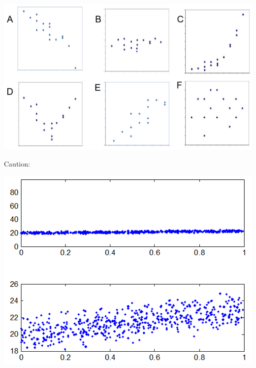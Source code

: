 \documentclass[11pt,letterpaper,twoside]{article}
\begin{document}
\begin{center}
\includegraphics[scale=0.8]{images/scatters2.png}
\end{center}

\newpage

Caution:

\begin{center}
\includegraphics[scale=1]{images/scatters3.png}
\end{center}

\label{totalpag}
\end{document}
